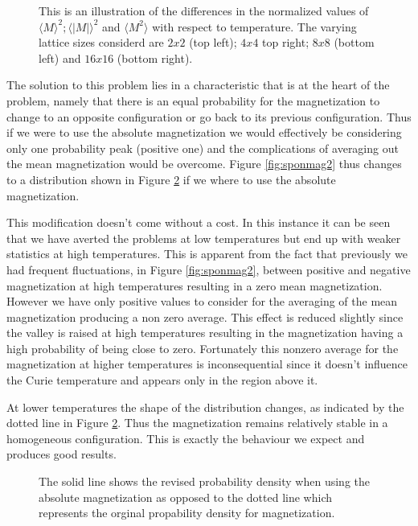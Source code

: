 \documentclass[a4paper]{article}
\begin{document}
\begin{figure}[htb]
  \centering
  \caption{This is an illustration of the differences in the normalized
    values of 
    $\langle M \rangle ^2; \langle |M| \rangle ^2$ and $\langle M^2
    \rangle$ with respect to temperature. The varying lattice sizes considerd are $2x2$ (top left); $4x4$ top right; $8x8$ (bottom left) and $16x16$ (bottom right).}
  \label{fig:variance_spon_mag} 
\end{figure}
The solution to this problem lies in a characteristic that is at the heart 
of the problem, namely that there is an equal probability for the
magnetization to change to an opposite configuration or go back to its
previous configuration. Thus if we were to use the absolute
magnetization we would effectively be considering only one probability
peak (positive one) and the complications of averaging out the mean magnetization
would be overcome. Figure \ref{fig:sponmag2} thus changes to a
distribution shown in Figure \ref{fig:sponmag3} if we where to use the 
absolute magnetization. 

This modification doesn't come without a cost. In this instance it can 
be seen that we have averted the problems at low temperatures but end
up with weaker statistics at high temperatures. This is apparent 
from the fact that previously we had frequent fluctuations, in Figure
\ref{fig:sponmag2}, between positive and negative magnetization at
high temperatures resulting in a zero mean magnetization. However we
have only positive values to consider for the averaging of the mean
magnetization producing a non zero average. This effect is reduced
slightly since the valley is raised at high temperatures resulting in the
magnetization having a high probability of being close to zero. Fortunately this nonzero
average for the magnetization at higher temperatures is
inconsequential since it doesn't influence the Curie temperature and
appears only in the region above it.

At lower temperatures the shape of the distribution changes, as
indicated by the dotted line in Figure \ref{fig:sponmag3}. Thus the
magnetization remains relatively stable in a homogeneous
configuration. This is exactly the behaviour we expect and produces
good results.
\begin{figure}[hbt]
  \centering
  \caption{The solid line shows the revised probability density when using the absolute
    magnetization as opposed to the dotted line which represents the orginal propability density for magnetization.}\label{fig:sponmag3} 
\end{figure}
\end{document}
